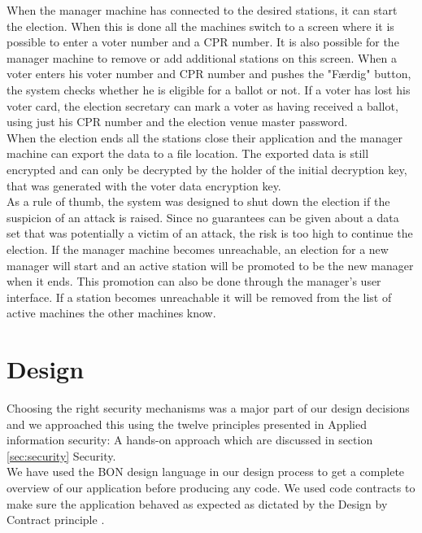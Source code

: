 \documentclass[a4paper]{report}
\begin{document}
When the manager machine has connected to the desired stations, it can start the election. When this is done all the machines switch to a screen where it is possible to enter a voter number and a CPR number. It is also possible for the manager machine to remove or add additional stations on this screen. When a voter enters his voter number and CPR number and pushes the "F\ae rdig" button, the system checks whether he is eligible for a ballot or not. If a voter has lost his voter card, the election secretary can mark a voter as having received a ballot, using just his CPR number and the election venue master password. \\

When the election ends all the stations close their application and the manager machine can export the data to a file location. The exported data is still encrypted and can only be decrypted by the holder of the initial decryption key, that was generated with the voter data encryption key. \\

As a rule of thumb, the system was designed to shut down the election if the suspicion of an attack is raised. Since no guarantees can be given about a data set that was potentially a victim of an attack, the risk is too high to continue the election. If the manager machine becomes unreachable, an election for a new manager will start and an active station will be promoted to be the new manager when it ends. This promotion can also be done through the manager's user interface. If a station becomes unreachable it will be removed from the list of active machines the other machines know.

\section{Design}
Choosing the right security mechanisms was a major part of our design decisions and we approached this using the twelve principles presented in Applied information security: A hands-on approach \cite{basin} which are discussed in section \ref{sec:security} Security. \\

We have used the BON design language \cite{bon} in our design process to get a complete overview of our application before producing any code. We used code contracts \cite{codec} to make sure the application behaved as expected as dictated by the Design by Contract principle \cite{dbc}. \\
\end{document}
